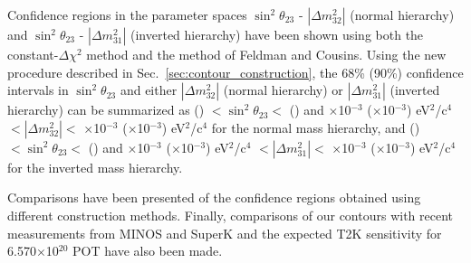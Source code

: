 Confidence regions in the parameter spaces $\sin^{2}\theta_{23}$ - $|\Delta m^{2}_{32}|$ (normal hierarchy) and
$\sin^{2}\theta_{23}$ - $|\Delta m^{2}_{31}|$ (inverted hierarchy)
have been shown using both the constant-$\Delta\chi^2$ method and the method of Feldman and Cousins.
Using the new procedure described in Sec.\ \ref{sec:contour_construction}, the 68\% (90\%) confidence intervals 
in $\sin^{2}\theta_{23}$ and either $|\Delta m^{2}_{32}|$ (normal hierarchy) or $|\Delta m^{2}_{31}|$ (inverted hierarchy) 
can be summarized as
\resultNormalMixingOneSigmaFCLo\xspace(\resultNormalMixingTwoSigmaFCLo)
$< \sin^{2}\theta_{23} <$
\resultNormalMixingOneSigmaFCHi\xspace(\resultNormalMixingTwoSigmaFCHi)
and
\resultNormalDmsqOneSigmaFCLo$\times$10$^{-3}$ (\resultNormalDmsqTwoSigmaFCLo$\times$10$^{-3}$) eV$^{2}$/c$^{4}$
$< |\Delta m^{2}_{32}| < $
\resultNormalDmsqOneSigmaFCHi$\times$10$^{-3}$ (\resultNormalDmsqTwoSigmaFCHi$\times$10$^{-3}$) eV$^{2}$/c$^{4}$
for the normal mass hierarchy,
and
\resultInvertedMixingOneSigmaFCLo\xspace(\resultInvertedMixingTwoSigmaFCLo)
$< \sin^{2}\theta_{23} <$
\resultInvertedMixingOneSigmaFCHi\xspace(\resultInvertedMixingTwoSigmaFCHi)
and
\resultInvertedDmsqOneSigmaFCLo$\times$10$^{-3}$ (\resultInvertedDmsqTwoSigmaFCLo$\times$10$^{-3}$) eV$^{2}$/c$^{4}$
$< |\Delta m^{2}_{31}| < $
\resultInvertedDmsqOneSigmaFCHi$\times$10$^{-3}$ (\resultInvertedDmsqTwoSigmaFCHi$\times$10$^{-3}$) eV$^{2}$/c$^{4}$
for the inverted mass hierarchy.

Comparisons have been presented of the confidence regions obtained using different construction methods.
Finally, comparisons of our contours with
recent measurements from MINOS and SuperK
and the expected T2K sensitivity 
for 6.570$\times$10$^{20}$ POT
have also been made. 

